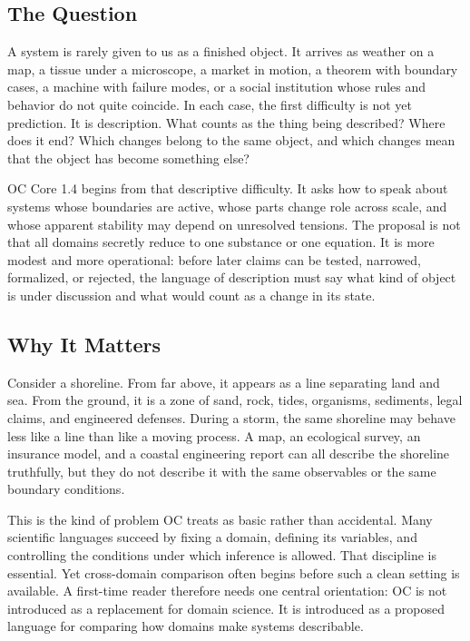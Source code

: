 \documentclass[11pt,a4paper,openany]{book}
\begin{document}
\subsection{The Question}
A system is rarely given to us as a finished object. It arrives as weather on a map, a tissue under a microscope, a market in motion, a theorem with boundary cases, a machine with failure modes, or a social institution whose rules and behavior do not quite coincide. In each case, the first difficulty is not yet prediction. It is description. What counts as the thing being described? Where does it end? Which changes belong to the same object, and which changes mean that the object has become something else? \cite{grimmett_percolation,goldenfeld_lectures}\par
OC Core 1.4 begins from that descriptive difficulty. It asks how to speak about systems whose boundaries are active, whose parts change role across scale, and whose apparent stability may depend on unresolved tensions. The proposal is not that all domains secretly reduce to one substance or one equation. It is more modest and more operational: before later claims can be tested, narrowed, formalized, or rejected, the language of description must say what kind of object is under discussion and what would count as a change in its state.\par
\subsection{Why It Matters}
Consider a shoreline. From far above, it appears as a line separating land and sea. From the ground, it is a zone of sand, rock, tides, organisms, sediments, legal claims, and engineered defenses. During a storm, the same shoreline may behave less like a line than like a moving process. A map, an ecological survey, an insurance model, and a coastal engineering report can all describe the shoreline truthfully, but they do not describe it with the same observables or the same boundary conditions. \cite{grimmett_percolation,goldenfeld_lectures}\par
This is the kind of problem OC treats as basic rather than accidental. Many scientific languages succeed by fixing a domain, defining its variables, and controlling the conditions under which inference is allowed. That discipline is essential. Yet cross-domain comparison often begins before such a clean setting is available. A first-time reader therefore needs one central orientation: OC is not introduced as a replacement for domain science. It is introduced as a proposed language for comparing how domains make systems describable.\par
\end{document}
